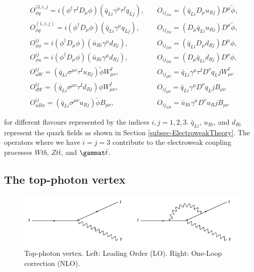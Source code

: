 \begin{align}
& O^{(3, i, j}_{\phi q} = i(\phi^{\dagger}\tau^I D_{\mu} \phi)(\bar{q}_{Li}\gamma^{\mu}\tau^I q_{Lj}), \quad & O_{ij}_{Du} = (\bar{q}_{Li} D_{\mu} u_{Rj}) D^{\mu} \tilde{\phi}, \\
& O^{(1, i, j)}_{\phi q} = i(\phi^{\dagger} D_{\mu} \phi)(\bar{q}_{Li}\gamma^{\mu} q_{Lj}), \quad & O_{ij}_{\bar{D}u} = (D_{\mu} \bar{q}_{Li} u_{Rj}) D^{\mu} \tilde{\phi}, \\
& O^{ij}_{\phi \phi} = i(\phi^{\dagger} D_{\mu} \phi)(\bar{u}_{Ri}\gamma^{\mu} d_{Rj}), \quad & O_{ij}_{Dd} = (\bar{q}_{Li} D_{\mu} d_{Rj}) D^{\mu} \phi, \\
& O^{ij}_{\phi u} = i(\phi^{\dagger} D_{\mu} \phi)(\bar{u}_{Ri}\gamma^{\mu} d_{Rj}), \quad & O_{ij}_{\bar{D}d} = (D_{\mu} \bar{q}_{Li} d_{Rj}) D^{\mu} \phi, \\
& O^{ij}_{uW} = (\bar{q}_{Li} \sigma^{\mu \nu} \tau^I u_{Rj})\tilde{\phi} W^I_{\mu \nu}, \quad & O_{ij}_{qW} = \bar{q}_{Li} \gamma^{\mu} \tau^I D^{\nu} q_Lj W^I_{\mu \nu}\\
& O^{ij}_{dW} = (\bar{q}_{Li} \sigma^{\mu \nu} \tau^I d_{Rj})\phi W^I_{\mu \nu}, \quad & O_{ij}_{qB} = \bar{q}_{Li} \gamma^{\mu} D^{\nu} q_Lj B_{\mu \nu}\\
& O^{ij}_{uB\phi} = (\bar{q}_{Li} \sigma^{\mu \nu} u_{Rj})\tilde{\phi} B_{\mu \nu}, \quad & O_{ij}_{uB} = \bar{u}_{Ri} \gamma^{\mu} D^{\nu} u_Rj B_{\mu \nu}
\end{align}

for different flavours represented by the indices $i,j = 1,2,3$. $\bar{q}_{Li}$, $u_{Ri}$, and $d_{Ri}$ represent the quark fields as shown in Section \ref{subsec-ElectroweakTheory}. The operators where we have $i = j = 3$ contribute to the electroweak coupling processes $Wtb$, $Zt\bar{t}$, and $\gammat\bar{t}$. 

\subsection{The top-photon vertex}

\begin{figure} \label{fig-TopPhotonVertex}
\begin{center}
\includegraphics[width=\textwidth]{Figures/TopPhotonVertex.png}
\caption{Top-photon vertex. Left: Leading Order (LO). Right: One-Loop correction (NLO).}
\end{center}
\end{figure}

